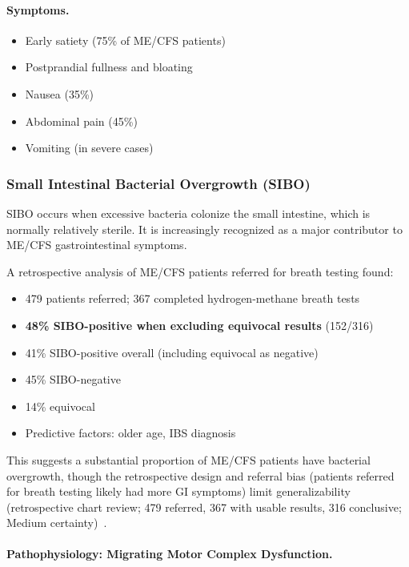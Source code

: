 \paragraph{Symptoms.}
\begin{itemize}
    \item Early satiety (75\% of ME/CFS patients)
    \item Postprandial fullness and bloating
    \item Nausea (35\%)
    \item Abdominal pain (45\%)
    \item Vomiting (in severe cases)
\end{itemize}

\subsubsection{Small Intestinal Bacterial Overgrowth (SIBO)}
\label{sec:sibo}

SIBO occurs when excessive bacteria colonize the small intestine, which is normally relatively sterile. It is increasingly recognized as a major contributor to ME/CFS gastrointestinal symptoms.

\begin{observation}
\label{obs:sibo-prevalence}
A retrospective analysis of ME/CFS patients referred for breath testing found:
\begin{itemize}
    \item 479 patients referred; 367 completed hydrogen-methane breath tests
    \item \textbf{48\% SIBO-positive when excluding equivocal results} (152/316)
    \item 41\% SIBO-positive overall (including equivocal as negative)
    \item 45\% SIBO-negative
    \item 14\% equivocal
    \item Predictive factors: older age, IBS diagnosis
\end{itemize}
This suggests a substantial proportion of ME/CFS patients have bacterial overgrowth, though the retrospective design and referral bias (patients referred for breath testing likely had more GI symptoms) limit generalizability (retrospective chart review; 479 referred, 367 with usable results, 316 conclusive; Medium certainty)~\cite{SIBOKarhu2023}.
\end{observation}

\paragraph{Pathophysiology: Migrating Motor Complex Dysfunction.}

